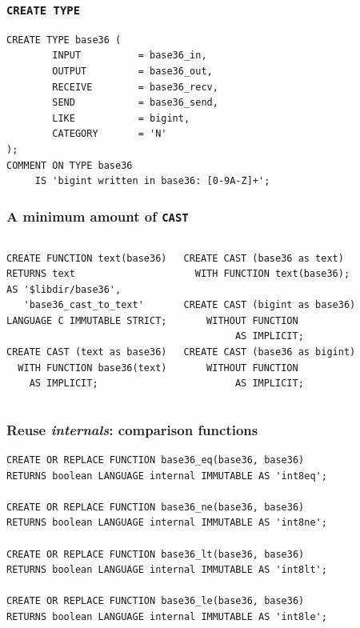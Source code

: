 \documentclass{beamer}
\begin{document}
\begin{frame}[fragile]
  \frametitle{\texttt{CREATE TYPE}}

\begin{verbatim}
CREATE TYPE base36 (
        INPUT          = base36_in,
        OUTPUT         = base36_out,
        RECEIVE        = base36_recv,
        SEND           = base36_send,
        LIKE           = bigint,
        CATEGORY       = 'N'
);
COMMENT ON TYPE base36
     IS 'bigint written in base36: [0-9A-Z]+';
\end{verbatim}
\end{frame}

\begin{frame}[fragile]
  \frametitle{A minimum amount of \texttt{CAST}}

\begin{columns}
\begin{verbatim}
CREATE FUNCTION text(base36)
RETURNS text
AS '$libdir/base36',
   'base36_cast_to_text'
LANGUAGE C IMMUTABLE STRICT;

CREATE CAST (text as base36)
  WITH FUNCTION base36(text)
    AS IMPLICIT;
\end{verbatim}  
\begin{verbatim}
CREATE CAST (base36 as text)
  WITH FUNCTION text(base36);

CREATE CAST (bigint as base36)
    WITHOUT FUNCTION
         AS IMPLICIT;
CREATE CAST (base36 as bigint)
    WITHOUT FUNCTION
         AS IMPLICIT;
\end{verbatim}
\end{columns}
\end{frame}

\begin{frame}[fragile]
  \frametitle{Reuse \textit{internals}: comparison functions}

\begin{verbatim}
CREATE OR REPLACE FUNCTION base36_eq(base36, base36) 
RETURNS boolean LANGUAGE internal IMMUTABLE AS 'int8eq';

CREATE OR REPLACE FUNCTION base36_ne(base36, base36) 
RETURNS boolean LANGUAGE internal IMMUTABLE AS 'int8ne';

CREATE OR REPLACE FUNCTION base36_lt(base36, base36) 
RETURNS boolean LANGUAGE internal IMMUTABLE AS 'int8lt';

CREATE OR REPLACE FUNCTION base36_le(base36, base36) 
RETURNS boolean LANGUAGE internal IMMUTABLE AS 'int8le';
\end{verbatim}
\end{frame}
\end{document}
